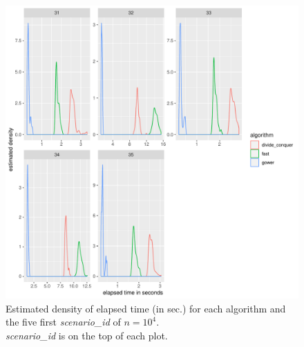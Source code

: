 \documentclass[11pt]{report}
\begin{document}
\begin{figure}[h]
\centering
    \includegraphics[scale=2]{./images/elapsed_time_10000_part1.pdf}
    \caption{
    Estimated density of elapsed time (in sec.) for each algorithm and the five 
    first \textit{scenario\_id} of $n=10^4$.\\
    \textit{scenario\_id} is on the top of each plot.
    }
\end{figure}

\FloatBarrier
\end{document}
